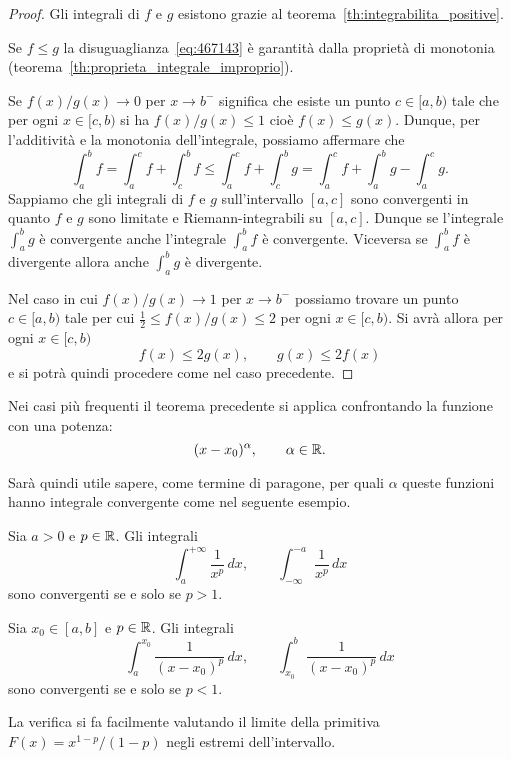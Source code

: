 \begin{proof}
\mymark{**}
Gli integrali di $f$ e $g$ esistono grazie al teorema~\ref{th:integrabilita_positive}.

Se $f\le g$ la disuguaglianza~\eqref{eq:467143} è garantità dalla proprietà di monotonia
(teorema~\ref{th:proprieta_integrale_improprio}).

Se $f(x)/g(x) \to 0$ per $x\to b^-$ significa che esiste un punto $c\in[a,b)$
tale che per ogni $x\in [c,b)$ si ha $f(x)/g(x)\le 1$ cioè $f(x)\le g(x)$.
Dunque, per l'additività e la monotonia dell'integrale, possiamo affermare che
\[
  \int_a^b f
  = \int_a^c f + \int_c^b f
  \le \int_a^c f + \int_c^b g
  = \int_a^c f + \int_a^b g - \int_a^c g.
\]
Sappiamo che gli integrali di $f$ e $g$ sull'intervallo
$[a,c]$ sono convergenti in quanto $f$ e $g$ sono
limitate e Riemann-integrabili su $[a,c]$.
Dunque se l'integrale $\int_a^b g$ è convergente anche l'integrale
$\int_a^b f$ è convergente.
Viceversa se $\int_a^b f$ è divergente allora anche $\int_a^b g$ è divergente.

Nel caso in cui $f(x)/g(x)\to 1$ per $x\to b^-$ possiamo trovare
un punto $c\in[a,b)$ tale per cui $\frac 1 2 \le f(x)/g(x) \le 2$
per ogni $x\in [c,b)$. Si avrà allora per ogni $x\in [c,b)$
\[
f(x) \le 2g(x), \qquad g(x) \le 2 f(x)
\]
e si potrà quindi procedere come nel caso precedente.
\end{proof}

Nei casi più frequenti il teorema precedente si applica confrontando la funzione con una potenza:
\[
  (x-x_0)^\alpha, \qquad \alpha \in \mathbb R.
\]

Sarà quindi utile sapere, come termine di paragone,
per quali $\alpha$ queste funzioni hanno integrale convergente
come nel seguente esempio.

\begin{example}
\label{ex:416145}%
\mymark{***}%
Sia $a>0$ e $p\in \mathbb R$. Gli integrali
\[
  \int_{a}^{+\infty}\frac{1}{x^p}\, dx,
  \qquad
  \int_{-\infty}^{-a}\frac{1}{x^p}\, dx
\]
sono convergenti se e solo se $p>1$.

Sia $x_0\in [a,b]$ e $p\in\mathbb R$.
Gli integrali
\[
  \int_a^{x_0} \frac{1}{(x-x_0)^p}\, dx,
  \qquad
  \int_{x_0}^b \frac{1}{(x-x_0)^p}\, dx
\]
sono convergenti se e solo se $p<1$.

La verifica si fa facilmente valutando il limite della primitiva
$F(x) = x^{1-p}/(1-p)$ negli estremi dell'intervallo.
\end{example}

